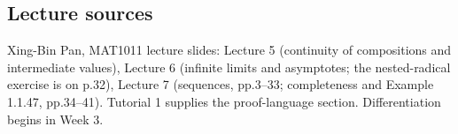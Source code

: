 \documentclass[11pt,a4paper]{article}
\begin{document}
\subsection{Lecture sources}\label{lecture-sources}

Xing-Bin Pan, MAT1011 lecture slides: Lecture 5 (continuity of
compositions and intermediate values), Lecture 6 (infinite limits and
asymptotes; the nested-radical exercise is on p.32), Lecture 7
(sequences, pp.3--33; completeness and Example 1.1.47, pp.34--41).
Tutorial 1 supplies the proof-language section. Differentiation begins
in Week 3.
\end{document}

